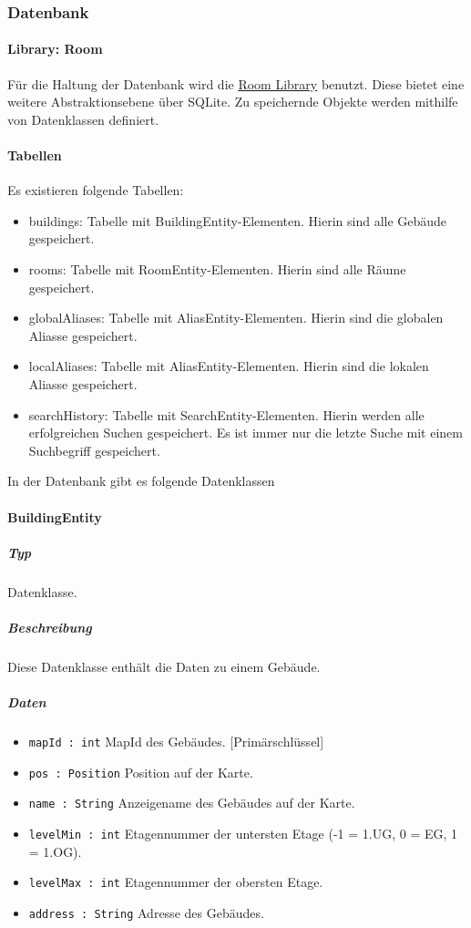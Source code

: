\subsubsection{Datenbank}\label{App_DataManagement_Datenbank}
\paragraph{Library: Room}
Für die Haltung der Datenbank wird die \href{https://developer.android.com/training/data-storage/room}
{Room Library} benutzt. Diese bietet eine weitere Abstraktionsebene über SQLite.
Zu speichernde Objekte werden mithilfe von Datenklassen definiert.

\paragraph{Tabellen}
Es existieren folgende Tabellen:
\begin{itemize}
    \item buildings: Tabelle mit BuildingEntity-Elementen. Hierin sind alle Gebäude gespeichert.
    \item rooms: Tabelle mit RoomEntity-Elementen. Hierin sind alle Räume gespeichert.
    \item globalAliases: Tabelle mit AliasEntity-Elementen. Hierin sind die globalen Aliasse gespeichert.
    \item localAliases: Tabelle mit AliasEntity-Elementen. Hierin sind die lokalen Aliasse gespeichert.
    \item searchHistory: Tabelle mit SearchEntity-Elementen. Hierin werden alle erfolgreichen Suchen gespeichert. 
    Es ist immer nur die letzte Suche mit einem Suchbegriff gespeichert.
\end{itemize}

In der Datenbank gibt es folgende Datenklassen

\paragraph{BuildingEntity}
\subparagraph*{Typ}
Datenklasse.
\subparagraph*{Beschreibung}
Diese Datenklasse enthält die Daten zu einem Gebäude.
\subparagraph*{Daten}
\begin{itemize}
    \item \texttt{mapId : int} MapId des Gebäudes. [Primärschlüssel]
    \item \texttt{pos : Position} Position auf der Karte.
    \item \texttt{name : String} Anzeigename des Gebäudes auf der Karte.
    \item \texttt{levelMin : int} Etagennummer der untersten Etage (-1 = 1.UG, 0 = EG, 1 = 1.OG).
    \item \texttt{levelMax : int} Etagennummer der obersten Etage.
    \item \texttt{address : String} Adresse des Gebäudes.
\end{itemize}


